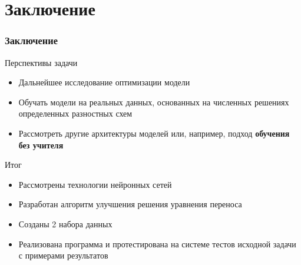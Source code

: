 \documentclass{beamer}
\begin{document}
\section{Заключение}
\begin{frame}
	\frametitle{Заключение}
	\begin{block}{Перспективы задачи}
		\begin{itemize} 
			\item Дальнейшее исследование оптимизации модели
			\item Обучать модели на реальных данных, основанных на численных решениях определенных разностных схем
			\item Рассмотреть другие архитектуры моделей или, например, подход \textbf{обучения без учителя}
		\end{itemize} 
	\end{block}
	\begin{block}{Итог}
		\begin{itemize}
			\item Рассмотрены технологии нейронных сетей
			\item Разработан алгоритм улучшения решения уравнения переноса
			\item Созданы 2 набора данных
			\item Реализована программа и протестирована на системе тестов исходной задачи с примерами результатов
		\end{itemize}
	\end{block}
\end{frame}
\end{document}
